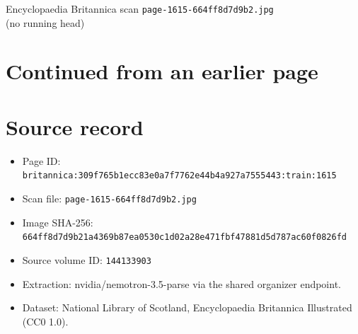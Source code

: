 \documentclass{article}
\begin{document}
\begin{center}
{\Large Encyclopaedia Britannica scan \texttt{page-1615-664ff8d7d9b2.jpg}}\\[0.5em]
(no running head)
\end{center}
\section*{Continued from an earlier page}
\section*{Source record}
\begin{itemize}
\item Page ID: \texttt{britannica:309f765b1ecc83e0a7f7762e44b4a927a7555443:train:1615}
\item Scan file: \texttt{page-1615-664ff8d7d9b2.jpg}
\item Image SHA-256: \texttt{664ff8d7d9b21a4369b87ea0530c1d02a28e471fbf47881d5d787ac60f0826fd}
\item Source volume ID: \texttt{144133903}
\item Extraction: nvidia/nemotron-3.5-parse via the shared organizer endpoint.
\item Dataset: National Library of Scotland, Encyclopaedia Britannica Illustrated (CC0 1.0).
\end{itemize}
\end{document}
